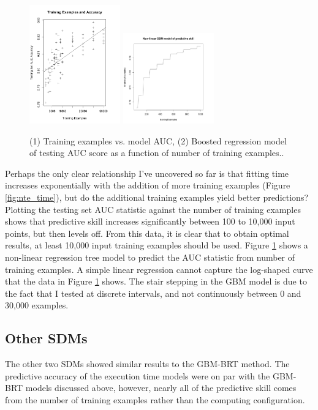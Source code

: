 \documentclass[a4paper]{article}
\begin{document}
\begin{figure}
\centering
\includegraphics[width=0.35\textwidth]{training_vs_ac_abline.png}
\includegraphics[width=0.35\textwidth]{nte_accuracy_gbm.png}
\caption{(1) Training examples vs. model AUC, (2) Boosted regression model of testing AUC score as a function of number of training examples..}\label{fig:acc_model}
\end{figure}

Perhaps the only clear relationship I've uncovered so far is that fitting time increases exponentially with the addition of more training examples (Figure \ref{fig:nte_time}), but do the additional training examples yield better predictions?  Plotting the testing set AUC statistic against the number of training examples shows that predictive skill increases significantly between 100 to 10,000 input points, but then levels off.  From this data, it is clear that to obtain optimal results, at least 10,000 input training examples should be used.  Figure \ref{fig:acc_model} shows a non-linear regression tree model to predict the AUC statistic from number of training examples. A simple linear regression cannot capture the log-shaped curve that the data in Figure \ref{fig:acc_model} shows.  The stair stepping in the GBM model is due to the fact that I tested at discrete intervals, and not continuously between 0 and 30,000 examples.

\subsection{ Other SDMs}
The other two SDMs showed similar results to the GBM-BRT method.  The predictive accuracy of the execution time models were on par with the GBM-BRT models discussed above, however, nearly all of the predictive skill comes from the number of training examples rather than the computing configuration. 
\end{document}
